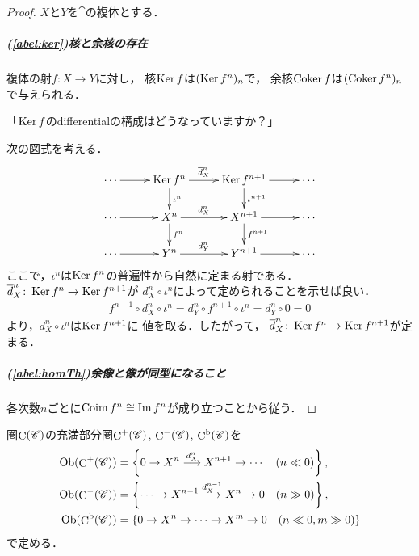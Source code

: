\begin{proof}$X$と$Y$を$\cat$の複体とする．
    \subparagraph*{(\ref{abel:ker})核と余核の存在}
    複体の射$f\colon X\to Y$に対し，
    核$\mathop{\mathrm{Ker}}\nolimits{f}$は$(\mathop{\mathrm{Ker}}\nolimits{f^n})_n$で，
    余核$\mathop{\mathrm{Coker}}\nolimits{f}$は$(\mathop{\mathrm{Coker}}\nolimits{f^n})_n$で与えられる．
    \begin{com*}[4/24]
        「$\mathop{\mathrm{Ker}}\nolimits{f}$のdifferentialの構成はどうなっていますか？」

        次の図式を考える．
        \begin{equation*}
            \vcenter{\xymatrix@C=26pt@R=18pt{
            \cdots \ar[r]
            & 
            \Ker{f^{n}}
            \ar[r]^-{\overline{d}_X^n}
            \ar[d]^-{\iota^n}
            &
            \Ker{f^{n+1}}
            \ar[r]
            \ar[d]^-{\iota^{n+1}} 
            &\cdots
            \\    
            \cdots \ar[r]
            & 
            X^{n}
            \ar[r]^-{d_X^n}
            \ar[d]^-{f^n}
            &
            X^{n+1}
            \ar[r]
            \ar[d]^-{f^{n+1}} 
            &\cdots
            \\
            \cdots \ar[r]
            & 
            Y^{n}
            \ar[r]^-{d_Y^n}
            &
            Y^{n+1}
            \ar[r]
            &\cdots
            }}
        \end{equation*}
        ここで，$\iota^n$は$\mathop{\mathrm{Ker}}\nolimits{f^n}$の普遍性から自然に定まる射である．
        $\overline{d}_X^n\colon\mathop{\mathrm{Ker}}\nolimits{f^n}\to\mathop{\mathrm{Ker}}\nolimits{f^{n+1}}$が
        $d_X^n\circ\iota^n$によって定められることを示せば良い．
        \begin{align*}
            f^{n+1}\circ d_X^n\circ\iota^n
            =d_Y^n\circ f^{n+1}\circ\iota^n
            =d_Y^n\circ0=0
        \end{align*}
        より，$d_X^n\circ\iota^n$は$\mathop{\mathrm{Ker}}\nolimits{f^{n+1}}$に
        値を取る．したがって，
        $\overline{d}_X^n\colon\mathop{\mathrm{Ker}}\nolimits{f^n}\to\mathop{\mathrm{Ker}}\nolimits{f^{n+1}}$が定まる．
    \end{com*}

    \subparagraph*{(\ref{abel:homTh})余像と像が同型になること}
    各次数$n$ごとに$\mathop{\mathrm{Coim}}\nolimits f^n\cong \mathop{\mathrm{Im}}\nolimits f^n$が成り立つことから従う．
\end{proof}
圏$\mathop{\mathrm{C}}\nolimits(\mathscr{C})$の充満部分圏$\mathop{\mathrm{C}}\nolimits^+(\mathscr{C})$, 
$\mathop{\mathrm{C}}\nolimits^-(\mathscr{C})$, $\mathop{\mathrm{C}}\nolimits^\mathrm{b}(\mathscr{C})$を
\begin{align*}
    \mathop{\textrm{Ob}}\nolimits(\mathop{\mathrm{C}}\nolimits^+(\mathscr{C}))
    &=\left\{
        0\rightarrow
        X^{n}\overset{d_X^{n}}{\longrightarrow}
        X^{n+1}\rightarrow\cdots
        \quad (n\ll 0)
    \right\}, \\
    \mathop{\textrm{Ob}}\nolimits(\mathop{\mathrm{C}}\nolimits^-(\mathscr{C}))
    &=\left\{
        \cdots\rightarrow 
        X^{n-1}\overset{d_X^{n-1}}{\longrightarrow}
        X^{n}\rightarrow
        0
        \quad (n\gg 0)
    \right\}, \\
    \mathop{\textrm{Ob}}\nolimits(\mathop{\mathrm{C}}\nolimits^\mathrm{b}(\mathscr{C}))
    &=\left\{ 
        0\rightarrow
        X^{n}\rightarrow
        \cdots\rightarrow 
        X^{m}\rightarrow
        0
        \quad (n\ll 0, m\gg0)
    \right\}
\end{align*}
で定める．


